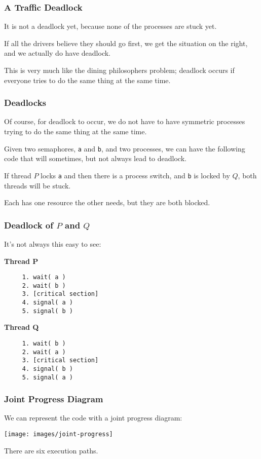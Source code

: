 \begin{frame}
\frametitle{A Traffic Deadlock}

It is not a deadlock yet, because none of the processes are stuck yet.

If all the drivers believe they should go first, we get the situation on the right, and we actually do have deadlock. 

This is very much like the dining philosophers problem; deadlock occurs if everyone tries to do the same thing at the same time.

\end{frame}

\begin{frame}
\frametitle{Deadlocks}

Of course, for deadlock to occur, we do not have to have symmetric processes trying to do the same thing at the same time. 

Given two semaphores, \texttt{a} and \texttt{b}, and two processes, we can have the following code that will sometimes, but not always lead to deadlock. 

If thread $P$ locks \texttt{a} and then there is a process switch, and \texttt{b} is locked by $Q$, both threads will be stuck. 

Each has one resource the other needs, but they are both blocked.


\end{frame}

\begin{frame}[fragile]
\frametitle{Deadlock of $P$ and $Q$}
It's not always this easy to see:


\begin{multicols}{2}
\textbf{Thread P}
  \begin{verbatim}
	 1. wait( a ) 
	 2. wait( b )
	 3. [critical section]
	 4. signal( a )
	 5. signal( b )
  \end{verbatim}
\columnbreak
\textbf{Thread Q}
  \begin{verbatim}
	 1. wait( b ) 
	 2. wait( a )
	 3. [critical section]
	 4. signal( b )
	 5. signal( a )
  \end{verbatim}
\end{multicols}

\end{frame}

\begin{frame}
\frametitle{Joint Progress Diagram}

We can represent the code with a \alert{joint progress diagram}:

\begin{center}
\texttt{[image: images/joint-progress]}
\end{center}

There are six execution paths.

\end{frame}

